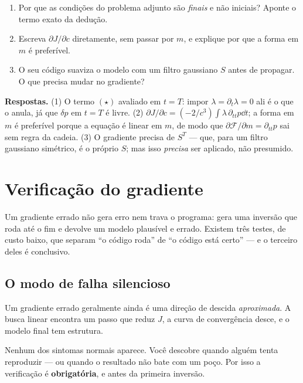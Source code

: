 \documentclass[11pt,a4paper,oneside]{report}
\begin{document}
\begin{exercicio}
\begin{enumerate}[leftmargin=*, itemsep=2pt]
\item Por que as condi\c{c}\~oes do problema adjunto s\~ao \emph{finais} e
n\~ao iniciais? Aponte o termo exato da dedu\c{c}\~ao.
\item Escreva $\partial J/\partial c$ diretamente, sem passar por $m$, e
explique por que a forma em $m$ \'e prefer\'ivel.
\item O seu c\'odigo suaviza o modelo com um filtro gaussiano $S$ antes de
propagar. O que precisa mudar no gradiente?
\end{enumerate}
\textbf{Respostas.} (1) O termo $(\star)$ avaliado em $t=T$: impor
$\lambda = \partial_t\lambda = 0$ ali \'e o que o anula, j\'a que $\delta p$
em $t=T$ \'e livre. (2) $\partial J/\partial c = (-2/c^{3})\int\lambda\,
\partial_{tt}p\dd t$; a forma em $m$ \'e prefer\'ivel porque a equa\c{c}\~ao
\'e linear em $m$, de modo que $\partial\mathcal{F}/\partial m = \partial_{tt}p$
sai sem regra da cadeia. (3) O gradiente precisa de $S^{T}$ --- que, para um
filtro gaussiano sim\'etrico, \'e o pr\'oprio $S$; mas isso \emph{precisa} ser
aplicado, n\~ao presumido.
\end{exercicio}

\chapter{Verifica\c{c}\~ao do gradiente}
\label{cap:verificacao}

\begin{ideia}
Um gradiente errado n\~ao gera erro nem trava o programa: gera uma invers\~ao
que roda at\'e o fim e devolve um modelo plaus\'ivel e errado. Existem tr\^es
testes, de custo baixo, que separam ``o c\'odigo roda'' de ``o c\'odigo
est\'a certo'' --- e o terceiro deles \'e conclusivo.
\end{ideia}

\section{O modo de falha silencioso}

\begin{armadilha}
Um gradiente errado geralmente ainda \'e uma dire\c{c}\~ao de descida
\emph{aproximada}. A busca linear encontra um passo que reduz $J$, a curva de
converg\^encia desce, e o modelo final tem estrutura.

Nenhum dos sintomas normais aparece. Voc\^e descobre quando algu\'em tenta
reproduzir --- ou quando o resultado n\~ao bate com um po\c{c}o. Por isso a
verifica\c{c}\~ao \'e \textbf{obrigat\'oria}, e antes da primeira invers\~ao.
\end{armadilha}
\end{document}
